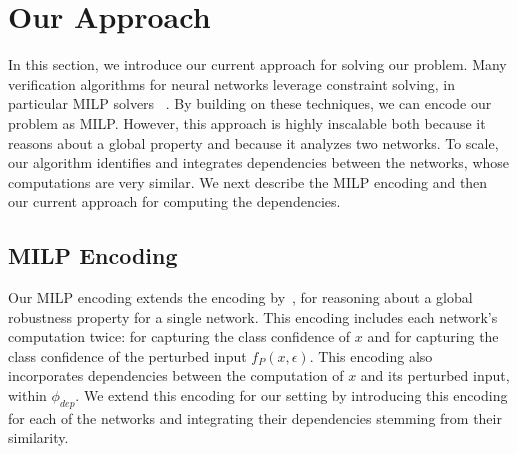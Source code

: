 
\section{Our Approach}
In this section, we introduce our current approach for solving our problem.
Many verification algorithms for neural networks leverage constraint solving, in particular MILP solvers ~\cite{VHAGAR,CFXROBUSTNESS,QEBVERIF,MIPVERIFY}.%
By building on these techniques, we can encode our problem as MILP. However, this approach is highly inscalable both because it reasons about a global property and because it analyzes two networks.
To scale, our algorithm identifies and integrates dependencies between the networks, whose computations are very similar. 
We next describe the MILP encoding and then our current approach for computing the dependencies.

\subsection{MILP Encoding}
Our MILP encoding extends the encoding by~\cite{VHAGAR}, for reasoning about a global robustness property for a single network.
This encoding includes each network's computation twice: for capturing the class confidence of $x$ and for capturing the class confidence of the perturbed input $f_P(x,\epsilon)$. This encoding also incorporates dependencies between the computation of $x$ and its perturbed input, within $\phi_{dep}$. We extend this encoding for our setting by introducing this encoding for each of the networks and integrating their dependencies stemming from their similarity.

